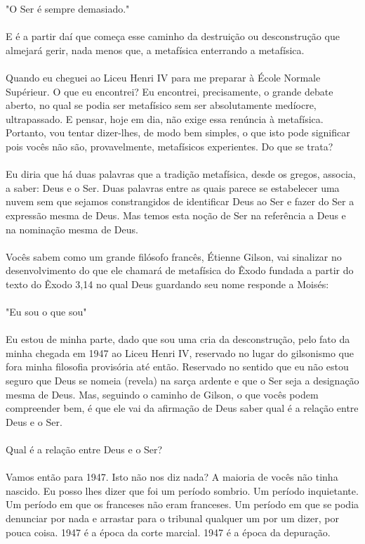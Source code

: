 \documentclass[10pt,a4paper]{book}
\begin{document}
	"O Ser é sempre demasiado."\\
	\\
	E é a partir daí que começa esse caminho da destruição ou desconstrução que almejará gerir, nada menos que, a metafísica enterrando a metafísica.\\
	\\
	Quando eu cheguei ao Liceu Henri IV para me preparar à École Normale Supérieur. O que eu encontrei? Eu encontrei, precisamente, o grande debate aberto, no qual se podia ser metafísico sem ser absolutamente medíocre, ultrapassado. E pensar, hoje em dia, não exige essa renúncia à metafísica.  Portanto, vou tentar dizer-lhes, de modo bem simples, o que isto pode significar pois vocês não são, provavelmente, metafísicos experientes. Do que se trata?\\
	\\
	Eu diria que há duas palavras que a tradição metafísica, desde os gregos, associa, a saber: Deus e o Ser. Duas palavras entre as quais parece se estabelecer uma nuvem sem que sejamos constrangidos de identificar Deus ao Ser e fazer do Ser a expressão mesma de Deus. Mas temos esta noção de Ser na referência a Deus e na nominação mesma de Deus.\\
	\\
	Vocês sabem como um grande filósofo francês, Étienne Gilson, vai sinalizar no desenvolvimento do que ele chamará de metafísica do Êxodo fundada a partir do texto do Êxodo 3,14 no qual Deus guardando seu nome responde a Moisés:\\
	\\
	"Eu sou o que sou"\\
	\\
	Eu estou de minha parte, dado que sou uma cria da desconstrução, pelo fato da minha chegada em 1947 ao Liceu Henri IV, reservado no lugar do gilsonismo que fora minha filosofia provisória até então. Reservado no sentido que eu não estou seguro que Deus se nomeia (revela) na sarça ardente e que o Ser seja a designação mesma de Deus. Mas, seguindo o caminho de Gilson, o que vocês podem compreender bem, é que ele vai da afirmação de Deus saber qual é a relação entre Deus e o Ser.\\
	\\
	Qual é a relação entre Deus e o Ser?\\
	\\
	Vamos então para 1947. Isto não nos diz nada? A maioria de vocês não tinha nascido. Eu posso lhes dizer que foi um período sombrio. Um período inquietante. Um período em que os franceses não eram franceses. Um período em que se podia denunciar por nada e arrastar para o tribunal qualquer um por um dizer, por pouca coisa. 1947 é a época da corte marcial. 1947 é a época da depuração.\\
\end{document}
